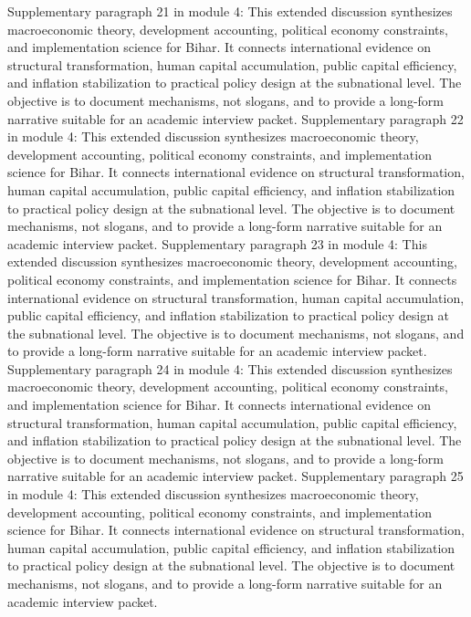 \documentclass[preprint,12pt]{elsarticle}
\begin{document}
Supplementary paragraph 21 in module 4: This extended discussion synthesizes macroeconomic theory, development accounting, political economy constraints, and implementation science for Bihar. It connects international evidence on structural transformation, human capital accumulation, public capital efficiency, and inflation stabilization to practical policy design at the subnational level. The objective is to document mechanisms, not slogans, and to provide a long-form narrative suitable for an academic interview packet.
Supplementary paragraph 22 in module 4: This extended discussion synthesizes macroeconomic theory, development accounting, political economy constraints, and implementation science for Bihar. It connects international evidence on structural transformation, human capital accumulation, public capital efficiency, and inflation stabilization to practical policy design at the subnational level. The objective is to document mechanisms, not slogans, and to provide a long-form narrative suitable for an academic interview packet.
Supplementary paragraph 23 in module 4: This extended discussion synthesizes macroeconomic theory, development accounting, political economy constraints, and implementation science for Bihar. It connects international evidence on structural transformation, human capital accumulation, public capital efficiency, and inflation stabilization to practical policy design at the subnational level. The objective is to document mechanisms, not slogans, and to provide a long-form narrative suitable for an academic interview packet.
Supplementary paragraph 24 in module 4: This extended discussion synthesizes macroeconomic theory, development accounting, political economy constraints, and implementation science for Bihar. It connects international evidence on structural transformation, human capital accumulation, public capital efficiency, and inflation stabilization to practical policy design at the subnational level. The objective is to document mechanisms, not slogans, and to provide a long-form narrative suitable for an academic interview packet.
Supplementary paragraph 25 in module 4: This extended discussion synthesizes macroeconomic theory, development accounting, political economy constraints, and implementation science for Bihar. It connects international evidence on structural transformation, human capital accumulation, public capital efficiency, and inflation stabilization to practical policy design at the subnational level. The objective is to document mechanisms, not slogans, and to provide a long-form narrative suitable for an academic interview packet.
\end{document}
